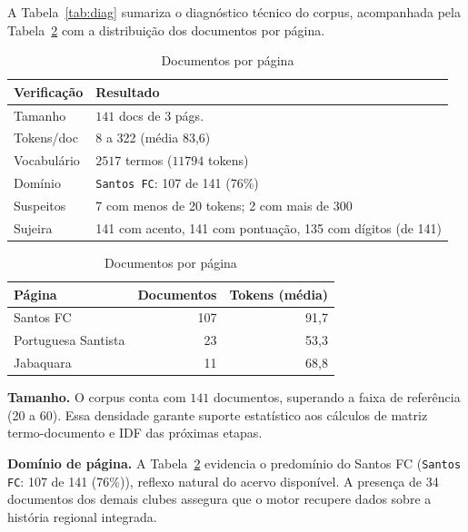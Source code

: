 \documentclass[
  article,
  12pt,
  oneside,
  a4paper,
  english,
  brazil
]{abntex2}\usepackage[]{graphicx}\usepackage[]{xcolor}
\begin{document}
A Tabela~\ref{tab:diag} sumariza o diagnóstico técnico do corpus, acompanhada pela Tabela~\ref{tab:origem} com a distribuição dos documentos por página.

\begin{table}[!htbp]
  \centering
  \begin{minipage}[t]{0.53\textwidth}
    \caption{Diagnóstico do corpus}
    \label{tab:diag}
    \scriptsize
    \begin{tabular}{@{}p{}p{}@{}}
      \toprule
      \textbf{Verificação} & \textbf{Resultado} \\
      \midrule
      Tamanho & $\text{141}$ docs de $\text{3}$ págs. \\
      Tokens/doc & 8 a 322 (m\'edia 83,6) \\
      Vocabulário & $\text{2517}$ termos ($\text{11794}$ tokens) \\
      Domínio & \texttt{Santos FC}: 107 de 141 (76\%) \\
      Suspeitos & 7 com menos de 20 tokens; 2 com mais de 300 \\
      Sujeira & 141 com acento, 141 com pontua\c{c}\~ao, 135 com d\'igitos (de 141) \\
      \bottomrule
    \end{tabular}
  \end{minipage}\hfill
  \begin{minipage}[t]{0.43\textwidth}
    \caption{Documentos por página}
    \label{tab:origem}
    \scriptsize

\begin{tabular}{lrr}
\toprule
P\'agina & Documentos & Tokens (m\'edia)\\
\midrule
Santos FC & 107 & 91,7\\
Portuguesa Santista & 23 & 53,3\\
Jabaquara & 11 & 68,8\\
\bottomrule
\end{tabular}


  \end{minipage}
\end{table}

\textbf{Tamanho.} O corpus conta com $\text{141}$ documentos, superando a faixa de referência (20 a 60). Essa densidade garante suporte estatístico aos cálculos de matriz termo-documento e IDF das próximas etapas.

\textbf{Domínio de página.} A Tabela~\ref{tab:origem} evidencia o predomínio do Santos FC (\texttt{Santos FC}: 107 de 141 (76\%)), reflexo natural do acervo disponível. A presença de 34 documentos dos demais clubes assegura que o motor recupere dados sobre a história regional integrada.
\end{document}
